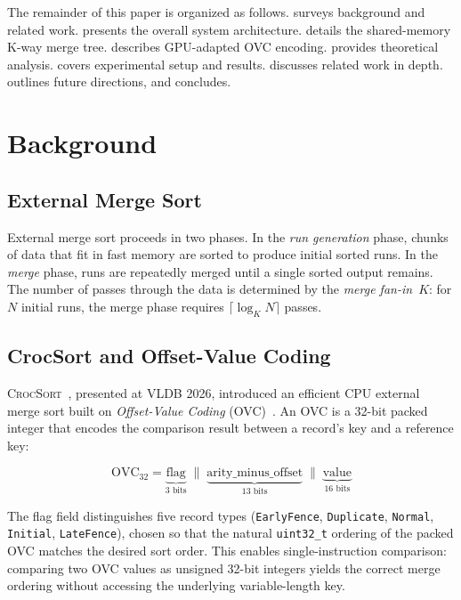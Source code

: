 \documentclass[conference,10pt]{IEEEtran}
\newcommand{\crocsort}{\textsc{CrocSort}\xspace}
\newcommand{\ovc}{\textsc{OVC}\xspace}
\begin{document}
The remainder of this paper is organized as follows.
 surveys background and related work.
 presents the overall system architecture.
 details the shared-memory K-way merge tree.
 describes GPU-adapted OVC encoding.
 provides theoretical analysis.
 covers experimental setup and results.
 discusses related work in depth.
 outlines future directions, and
 concludes.


\section{Background}
\label{sec:background}

\subsection{External Merge Sort}
External merge sort proceeds in two phases.  In the \emph{run generation}
phase, chunks of data that fit in fast memory are sorted to produce initial
sorted runs.  In the \emph{merge} phase, runs are repeatedly merged until a
single sorted output remains.  The number of passes through the data is
determined by the \emph{merge fan-in}~$K$: for $N$ initial runs, the merge
phase requires $\lceil\log_K N\rceil$ passes.

\subsection{CrocSort and Offset-Value Coding}
\crocsort~\cite{crocsort2026}, presented at VLDB 2026, introduced an
efficient CPU external merge sort built on \emph{Offset-Value Coding}
(\ovc)~\cite{ovc_original}.  An OVC is a 32-bit packed integer that encodes
the comparison result between a record's key and a reference key:

\begin{equation}
  \text{OVC}_{32} = \underbrace{\text{flag}}_{3\text{ bits}} \;\|\;
                     \underbrace{\text{arity\_minus\_offset}}_{13\text{ bits}} \;\|\;
                     \underbrace{\text{value}}_{16\text{ bits}}
  \label{eq:ovc_format}
\end{equation}

The flag field distinguishes five record types (\texttt{EarlyFence},
\texttt{Duplicate}, \texttt{Normal}, \texttt{Initial}, \texttt{LateFence}),
chosen so that the natural \texttt{uint32\_t} ordering of the packed OVC
matches the desired sort order.  This enables single-instruction comparison:
comparing two OVC values as unsigned 32-bit integers yields the correct
merge ordering without accessing the underlying variable-length key.
\end{document}

